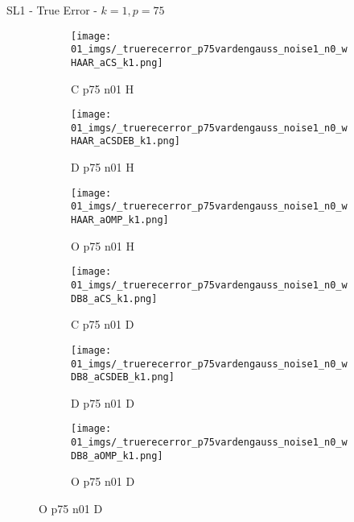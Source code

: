 \begin{frame}{SL1 - True Error - $k=1,p=75$}{}
\begin{figure}
\begin{subfigure}{0.13\textwidth}
\texttt{[image: 01\_imgs/\_truerecerror\_p75vardengauss\_noise1\_n0\_wHAAR\_aCS\_k1.png]}
\caption*{\tiny C p75 n01 H}
\end{subfigure}
\begin{subfigure}{0.13\textwidth}
\texttt{[image: 01\_imgs/\_truerecerror\_p75vardengauss\_noise1\_n0\_wHAAR\_aCSDEB\_k1.png]}
\caption*{\tiny D p75 n01 H}
\end{subfigure}
\begin{subfigure}{0.13\textwidth}
\texttt{[image: 01\_imgs/\_truerecerror\_p75vardengauss\_noise1\_n0\_wHAAR\_aOMP\_k1.png]}
\caption*{\tiny O p75 n01 H}
\end{subfigure}
\begin{subfigure}{0.13\textwidth}
\texttt{[image: 01\_imgs/\_truerecerror\_p75vardengauss\_noise1\_n0\_wDB8\_aCS\_k1.png]}
\caption*{\tiny C p75 n01 D}
\end{subfigure}
\begin{subfigure}{0.13\textwidth}
\texttt{[image: 01\_imgs/\_truerecerror\_p75vardengauss\_noise1\_n0\_wDB8\_aCSDEB\_k1.png]}
\caption*{\tiny D p75 n01 D}
\end{subfigure}
\begin{subfigure}{0.13\textwidth}
\texttt{[image: 01\_imgs/\_truerecerror\_p75vardengauss\_noise1\_n0\_wDB8\_aOMP\_k1.png]}
\caption*{\tiny O p75 n01 D}
\end{subfigure}

\vspace{5pt}


\end{figure}
\end{frame}
